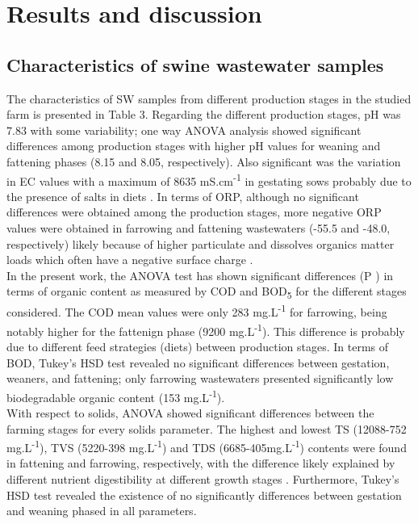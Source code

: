 \section{Results and discussion}
\subsection{Characteristics of swine wastewater samples}
The characteristics of SW samples from different production stages in the studied farm is presented in Table 3. Regarding the different production stages, pH was 7.83 with some variability; one way ANOVA analysis showed significant differences among production stages with higher pH values for weaning and fattening phases (8.15 and 8.05, respectively). Also significant was the variation in EC values with a maximum of 8635 mS.cm\textsuperscript{-1} in gestating sows probably due to the presence of salts in diets \cite{Mart_nez_Suller_2008,Moral_2005}. In terms of ORP, although no significant differences were obtained among the production stages, more negative ORP values were obtained in farrowing and fattening wastewaters (-55.5 and -48.0, respectively) likely because of higher particulate and dissolves organics matter loads which often have a negative surface charge \cite{Hjorth_2011}.\\
In the present work, the ANOVA test has shown significant differences (P ) in terms of organic content as measured by COD and BOD\textsubscript{5} for the different stages considered. The COD mean values were only 283 mg.L\textsuperscript{-1} for farrowing, being notably higher for the fattenign phase (9200 mg.L\textsuperscript{-1}). This difference is probably due to different feed strategies (diets) between production stages. In terms of BOD, Tukey’s HSD test revealed no significant differences between gestation, weaners, and fattening; only farrowing wastewaters presented significantly low biodegradable organic content (153 mg.L\textsuperscript{-1}).\\
With respect to solids, ANOVA showed significant differences between the farming stages for every solids parameter. The highest and lowest TS (12088-752 mg.L\textsuperscript{-1}), TVS (5220-398 mg.L\textsuperscript{-1}) and TDS (6685-405mg.L\textsuperscript{-1}) contents were found in fattening and farrowing, respectively, with the difference likely explained by different nutrient digestibility at different growth stages \cite{Zhang_2014}. Furthermore, Tukey’s HSD test revealed the existence of no significantly differences between gestation and weaning phased in all parameters.\\
